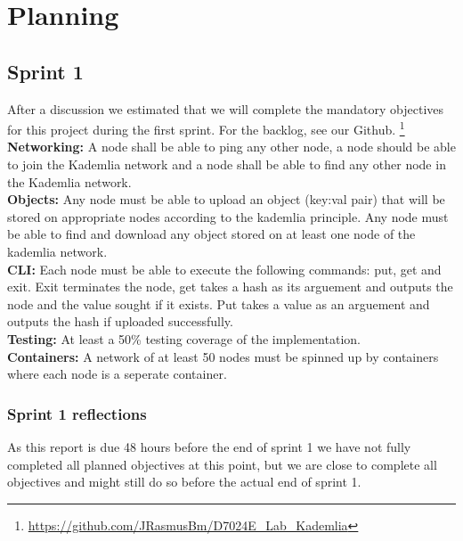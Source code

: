 \section{Planning}\label{sec:planning}

\subsection{Sprint 1}\label{sec:sprint-1}

After a discussion we estimated that we will complete the mandatory objectives 
for this project during the first sprint. For the backlog, see our Github.
\footnote{\href{https://github.com/JRasmusBm/D7024E_Lab_Kademlia}{https://github.com/JRasmusBm/D7024E\_Lab\_Kademlia}}\\

\textbf{Networking:} A node shall be able to ping any other node, a node should be able to join the Kademlia network and a node shall be able to find any other node in the Kademlia network.\\

\textbf{Objects:} Any node must be able to upload an object (key:val pair) that will be stored on appropriate nodes according to the kademlia principle. Any node must be able to find and download any object stored on at least one node of the kademlia network.\\

\textbf{CLI:} Each node must be able to execute the following commands: put, get and exit. Exit terminates the node, get takes a hash as its arguement and outputs the node and the value sought if it exists. Put takes a value as an arguement and outputs the hash if uploaded successfully.\\

\textbf{Testing:} At least a 50\% testing coverage of the implementation.\\

\textbf{Containers:} A network of at least 50 nodes must be spinned up by containers where each node is a seperate container.


\subsubsection{Sprint 1 reflections}\label{sec:sprint-1-reflections}
As this report is due 48 hours before the end of sprint 1 we have not fully completed all planned objectives at this point, but we are close to complete all objectives and might still do so before the actual end of sprint 1.\\

